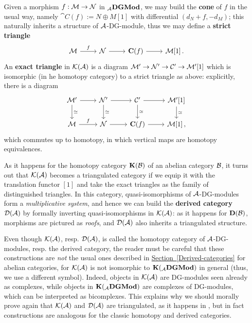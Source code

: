 	Given a morphism $f:\mathcal{M} \to \mathcal{N}$ in ${}_{\mathcal{A}}{\normalfont\textbf{DGMod}}$,
	we may build the \textbf{cone} of $f$ in the usual way, namely
	$\cat{C}(f) := N \oplus M[1]$ with differential $(d_{N} + f, -d_{M})$;
	this naturally inherits a structure of $\mathcal{A}$-DG-module,
	thus we may define a \textbf{strict triangle}
	\begin{equation*}
		\begin{tikzcd}
			\Mm \ar[r, "f"] & \Nn \ar[r] & \cat{C}(f) \ar[r] & \Mm{[1]}\,.
		\end{tikzcd}
	\end{equation*}
	An \textbf{exact triangle} in $\mathcal{K}(\mathcal{A})$
	is a diagram $\mathcal{M}' \to \mathcal{N}' \to \mathcal{C}' \to \mathcal{M}'[1]$
	which is isomorphic (in he homotopy category) to a strict
	triangle as above: explicitly, there is a diagram
	\begin{equation*}
		\begin{tikzcd}
			\Mm' \ar[r] \ar[d, "\simeq"] & \Nn' \ar[r] \ar[d, "\simeq"] & \Cc' \ar[r] \ar[d, "\simeq"] & \Mm'{[1]} \ar[d, "\simeq"] \\
			\Mm \ar[r, "f"] & \Nn \ar[r] & \cat{C}(f) \ar[r] & \Mm{[1]}\,,
		\end{tikzcd}
	\end{equation*}
	which commutes up to homotopy, in which vertical maps are homotopy equivalences.
	
	As it happens for the homotopy category ${\normalfont\textbf{K}}(\mathcal{B})$ of an abelian category $\mathcal{B}$,
	it turns out that $\mathcal{K}(\mathcal{A})$ becomes a triangulated category 
	if we equip it with
	the translation functor $[1]$ and take the exact triangles as the family
	of distinguished triangles. In this category, quasi-isomorphisms of $\mathcal{A}$-DG-modules
	form a \emph{multiplicative system}, and hence we can 
	build the \textbf{derived category} $\mathcal{D}(\mathcal{A})$ by formally inverting
	quasi-isomorphisms in $\mathcal{K}(\mathcal{A})$: as it happens for ${\normalfont\textbf{D}}(\mathcal{B})$,
	morphisms are pictured as \emph{roofs}, and $\mathcal{D}(\mathcal{A})$ also inherits
	a triangulated structure.
	
	\begin{rmk}
		Even though $\mathcal{K}(\mathcal{A})$, resp. $\mathcal{D}(\mathcal{A})$, is called 
		the homotopy category of $\mathcal{A}$-DG-modules, resp. the derived category,
		the reader must be careful that these constructions are \emph{not}
		the usual ones described in 
		\hyperref[Derived-categories]{Section~\ref{Derived-categories}} 
		for abelian categories, 
		for $\mathcal{K}(\mathcal{A})$ is not isomorphic to ${\normalfont\textbf{K}}({}_{\mathcal{A}}{\normalfont\textbf{DGMod}})$ in general
		(thus, we use a different symbol). Indeed, objects in $\mathcal{K}(\mathcal{A})$ are
		DG-modules seen already as complexes, while objects in ${\normalfont\textbf{K}}({}_{\mathcal{A}}{\normalfont\textbf{DGMod}})$
		are complexes of DG-modules, which can be interpreted as bicomplexes.
		This explains why we should morally prove again 
		that $\mathcal{K}(\mathcal{A})$ and $\mathcal{D}(\mathcal{A})$ are triangulated,
		as it happens in \parencite[Part II]{bernstein-lunts}, 
		but in fact constructions are analogous for the classic homotopy and derived categories.
	\end{rmk}
	
